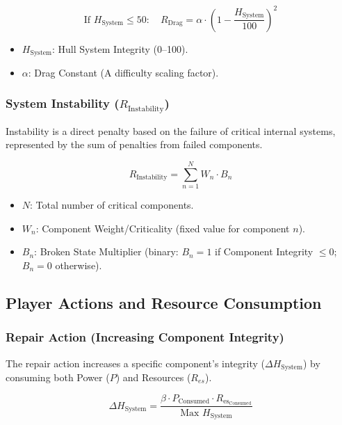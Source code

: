 \documentclass{article}
\newenvironment{mathbox}[1][\unskip]{
    \begin{tcolorbox}
    \textbf{#1}
}{
    \end{tcolorbox}
}
\begin{document}
\begin{mathbox}
$$
\text{If } H_{\text{System}} \le 50: \quad R_{\text{Drag}} = \alpha \cdot \left(1 - \frac{H_{\text{System}}}{100}\right)^2
$$
\end{mathbox}

\begin{itemize}
    \item $H_{\text{System}}$: Hull System Integrity (0--100).
    \item $\alpha$: Drag Constant (A difficulty scaling factor).
\end{itemize}

\subsubsection{System Instability ($R_{\text{Instability}}$)}
Instability is a direct penalty based on the failure of critical internal systems, represented by the sum of penalties from failed components.

\begin{mathbox}
$$
R_{\text{Instability}} = \sum_{n=1}^N W_n \cdot B_n
$$
\end{mathbox}

\begin{itemize}
    \item $N$: Total number of critical components.
    \item $W_n$: Component Weight/Criticality (fixed value for component $n$).
    \item $B_n$: Broken State Multiplier (binary: $B_n=1$ if Component Integrity $\le 0$; $B_n=0$ otherwise).
\end{itemize}

\vspace{1em}
\subsection{Player Actions and Resource Consumption}\hspace{0.5em}

\subsubsection{Repair Action (Increasing Component Integrity)}
The repair action increases a specific component's integrity ($\Delta H_{\text{System}}$) by consuming both Power ($P$) and Resources ($R_{es}$).

\begin{mathbox}
$$
\Delta H_{\text{System}} = \frac{\beta \cdot P_{\text{Consumed}} \cdot R_{\text{es}_{\text{Consumed}}}}{\text{Max } H_{\text{System}}}
$$
\end{mathbox}
\end{document}
